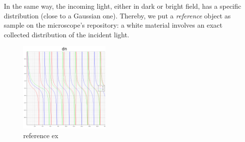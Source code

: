 \documentclass{article}
\numberwithin{equation}{section}
\begin{document}
In the same way, the incoming light, either in dark or bright field, has a specific distribution (close to a Gaussian one). Thereby, we put a \textit{reference} object as sample on the microscope's repository: a white material involves an exact collected distribution of the incident light.
\begin{figure}[h]
    \centering
    \includegraphics[width=0.4\textwidth, height=0.35\textwidth]{dn.png}
    \caption{reference ex}
    \label{fig:reference_ex}
\end{figure}
\end{document}

